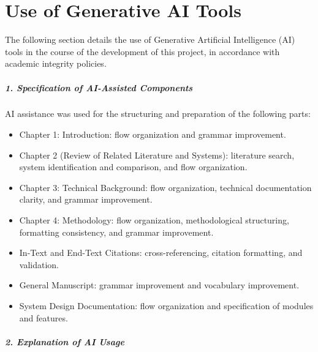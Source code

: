 \chapter{Use of Generative AI Tools}
\label{app:use_of_generative_ai}

\hspace*{\parindent} The following section details the use of Generative Artificial Intelligence (AI) tools in the course of the development of this project, in accordance with academic integrity policies.


\paragraph{1. Specification of AI-Assisted Components}\hspace*{\parindent}


\hspace*{\parindent} AI assistance was used for the structuring and preparation of the following parts:
\begin{itemize}
    \item Chapter 1: Introduction: flow organization and grammar improvement.
    \item Chapter 2 (Review of Related Literature and Systems): literature search, system identification and comparison, and flow organization.
    \item Chapter 3: Technical Background: flow organization, technical documentation clarity, and grammar improvement.
    \item Chapter 4: Methodology: flow organization, methodological structuring, formatting consistency, and grammar improvement.
    \item In-Text and End-Text Citations: cross-referencing, citation formatting, and validation.
    \item General Manuscript: grammar improvement and vocabulary improvement.
    \item System Design Documentation: flow organization and specification of modules and features.
\end{itemize}


\paragraph{2. Explanation of AI Usage}\hspace*{\parindent}


